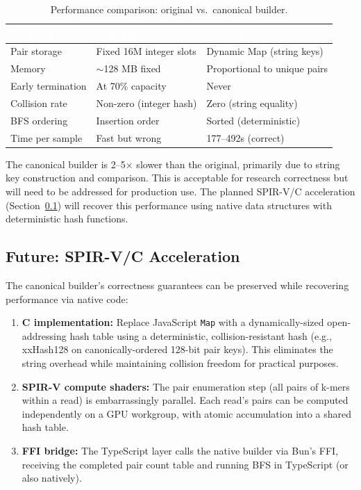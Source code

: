 \documentclass{../yalumba}
\begin{document}
\begin{table}[H]
\centering
\caption{Performance comparison: original vs.\ canonical builder.}
\label{tab:performance}
\begin{tabular}{lll}
\toprule
\rowcolor{table-header}
\textcolor{white}{\textbf{Property}} & \textcolor{white}{\textbf{Original}} & \textcolor{white}{\textbf{Canonical}} \\
\midrule
Pair storage    & Fixed 16M integer slots & Dynamic Map (string keys) \\
Memory          & $\sim$128 MB fixed       & Proportional to unique pairs \\
Early termination & At 70\% capacity       & Never \\
Collision rate  & Non-zero (integer hash)  & Zero (string equality) \\
BFS ordering    & Insertion order          & Sorted (deterministic) \\
Time per sample & Fast but wrong           & 177--492s (correct) \\
\bottomrule
\end{tabular}
\end{table}

\begin{limitation}
The canonical builder is 2--5$\times$ slower than the original, primarily due
to string key construction and comparison. This is acceptable for research
correctness but will need to be addressed for production use. The planned
SPIR-V/C acceleration (Section~\ref{sec:spirv}) will recover this performance
using native data structures with deterministic hash functions.
\end{limitation}

\subsection{Future: SPIR-V/C Acceleration}
\label{sec:spirv}

The canonical builder's correctness guarantees can be preserved while recovering
performance via native code:

\begin{enumerate}[leftmargin=2em]
  \item \textbf{C implementation:} Replace JavaScript \texttt{Map} with a
    dynamically-sized open-addressing hash table using a deterministic,
    collision-resistant hash (e.g., xxHash128 on canonically-ordered 128-bit
    pair keys). This eliminates the string overhead while maintaining
    collision freedom for practical purposes.
  \item \textbf{SPIR-V compute shaders:} The pair enumeration step (all pairs
    of k-mers within a read) is embarrassingly parallel. Each read's pairs can
    be computed independently on a GPU workgroup, with atomic accumulation into
    a shared hash table.
  \item \textbf{FFI bridge:} The TypeScript layer calls the native builder via
    Bun's FFI, receiving the completed pair count table and running BFS in
    TypeScript (or also natively).
\end{enumerate}
\end{document}
